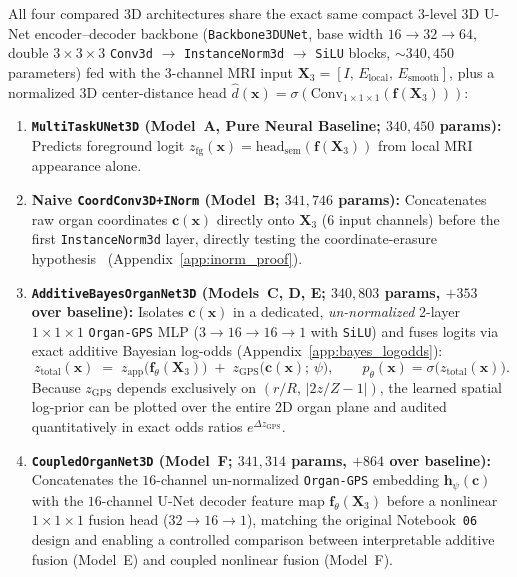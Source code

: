 \documentclass[10pt,a4paper]{article}
\renewcommand{\_}{\origunderscore\allowbreak}
\begin{document}
All four compared 3D architectures share the exact same compact 3-level 3D U-Net encoder--decoder backbone (\texttt{Backbone3DUNet}, base width $16 \to 32 \to 64$, double $3\times 3\times 3$ \texttt{Conv3d} $\to$ \texttt{InstanceNorm3d} $\to$ \texttt{SiLU} blocks, $\sim 340{,}450$ parameters) fed with the 3-channel MRI input $\mathbf{X}_3 = [I,\, E_{\text{local}},\, E_{\text{smooth}}]$, plus a normalized 3D center-distance head $\hat{d}(\mathbf{x}) = \sigma(\text{Conv}_{1\times 1\times 1}(\mathbf{f}(\mathbf{X}_3)))$:
\begin{enumerate}
    \item \textbf{\texttt{MultiTaskUNet3D} (Model~A, Pure Neural Baseline; $340{,}450$ params):} Predicts foreground logit $z_{\text{fg}}(\mathbf{x}) = \text{head}_{\text{sem}}(\mathbf{f}(\mathbf{X}_3))$ from local MRI appearance alone.
    \item \textbf{Naive \texttt{CoordConv3D+INorm} (Model~B; $341{,}746$ params):} Concatenates raw organ coordinates $\mathbf{c}(\mathbf{x})$ directly onto $\mathbf{X}_3$ ($6$ input channels) before the first \texttt{InstanceNorm3d} layer, directly testing the coordinate-erasure hypothesis~\cite{liu2018coordconv,ulyanov2016instancenorm} (Appendix~\ref{app:inorm_proof}).
    \item \textbf{\texttt{AdditiveBayesOrganNet3D} (Models~C, D, E; $340{,}803$ params, $+353$ over baseline):} Isolates $\mathbf{c}(\mathbf{x})$ in a dedicated, \emph{un-normalized} 2-layer $1\times 1\times 1$ \texttt{Organ-GPS} MLP ($3 \to 16 \to 16 \to 1$ with \texttt{SiLU}) and fuses logits via exact additive Bayesian log-odds (Appendix~\ref{app:bayes_logodds}):
    \begin{equation}
        z_{\text{total}}(\mathbf{x}) \;=\; z_{\text{app}}\bigl(\mathbf{f}_\theta(\mathbf{X}_3)\bigr) \;+\; z_{\text{GPS}}\bigl(\mathbf{c}(\mathbf{x});\, \psi\bigr), \qquad p_\theta(\mathbf{x}) = \sigma\bigl(z_{\text{total}}(\mathbf{x})\bigr).
        \label{eq:additive_bayes}
    \end{equation}
    Because $z_{\text{GPS}}$ depends exclusively on $(r/R,\, |2z/Z - 1|)$, the learned spatial log-prior can be plotted over the entire 2D organ plane and audited quantitatively in exact odds ratios $e^{\Delta z_{\text{GPS}}}$.
    \item \textbf{\texttt{CoupledOrganNet3D} (Model~F; $341{,}314$ params, $+864$ over baseline):} Concatenates the $16$-channel un-normalized \texttt{Organ-GPS} embedding $\mathbf{h}_\psi(\mathbf{c})$ with the $16$-channel U-Net decoder feature map $\mathbf{f}_\theta(\mathbf{X}_3)$ before a nonlinear $1\times 1\times 1$ fusion head ($32 \to 16 \to 1$), matching the original Notebook~\texttt{06} design and enabling a controlled comparison between interpretable additive fusion (Model~E) and coupled nonlinear fusion (Model~F).
\end{enumerate}
\end{document}
